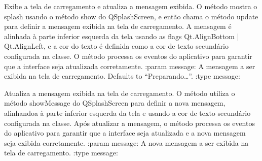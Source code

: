 \documentclass[letterpaper,10pt,english]{sphinxmanual}
\begin{document}
\begin{fulllineitems}
\begin{fulllineitems}
\label{\detokenize{api/loading_screen:loading_screen.LoadingScreen.show}}
\pysigstartsignatures
\pysiglinewithargsret
{}
{}
{}
\pysigstopsignatures
\sphinxAtStartPar
Exibe a tela de carregamento e atualiza a mensagem exibida. O método mostra o splash usando o método show do QSplashScreen, e então chama o método update para definir a mensagem exibida na tela de carregamento. A mensagem é alinhada à parte inferior esquerda da tela usando as flags Qt.AlignBottom | Qt.AlignLeft, e a cor do texto é definida como a cor de texto secundário configurada na classe. O método processa os eventos do aplicativo para garantir que a interface seja atualizada corretamente.
:param message: A mensagem a ser exibida na tela de carregamento. Defaults to “Preparando…”.
:type message: 
\begin{quote}\begin{description}
\sphinxAtStartPar
{}

\end{description}\end{quote}

\end{fulllineitems}


\begin{fulllineitems}
\label{\detokenize{api/loading_screen:loading_screen.LoadingScreen.update}}
\pysigstartsignatures
\pysiglinewithargsret
{}
{}
{}
\pysigstopsignatures
\sphinxAtStartPar
Atualiza a mensagem exibida na tela de carregamento. O método utiliza o método showMessage do QSplashScreen para definir a nova mensagem, alinhando\sphinxhyphen{}a à parte inferior esquerda da tela e usando a cor de texto secundário configurada na classe. Após atualizar a mensagem, o método processa os eventos do aplicativo para garantir que a interface seja atualizada e a nova mensagem seja exibida corretamente.
:param message: A nova mensagem a ser exibida na tela de carregamento.
:type message: 
\begin{quote}\begin{description}
\sphinxAtStartPar
{}


\end{description}
\end{quote}
\end{fulllineitems}
\end{fulllineitems}
\end{document}

